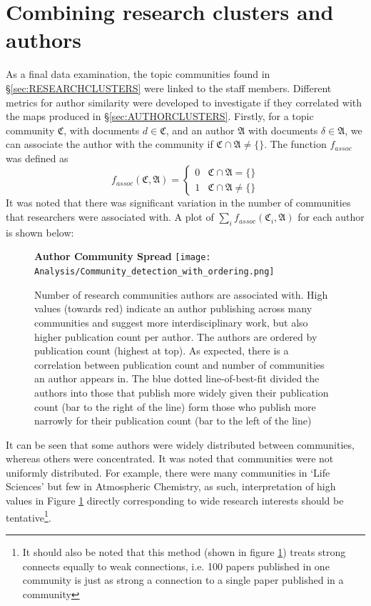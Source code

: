 \section{Combining research clusters and authors}
As a final data examination, the topic communities found in  \S\ref{sec:RESEARCHCLUSTERS} were linked to the staff members. Different metrics for author similarity were developed to investigate if they correlated with the maps produced in \S\ref{sec:AUTHORCLUSTERS}.
Firstly, for a topic community $\mathfrak{C}$, with documents $d \in \mathfrak{C}$, and an author $\mathfrak{A}$ with documents $\delta \in \mathfrak{A}$, we can associate the author with the community if $\mathfrak{C} \cap \mathfrak{A} \neq \{ \}$. The function $f_{assoc}$ was defined as 
\[ 
f_{assoc}\left( \mathfrak{C} , \mathfrak{A} \right) = \begin{cases} 
      0 & \mathfrak{C} \cap \mathfrak{A} = \{ \} \\
      1 & \mathfrak{C} \cap \mathfrak{A} \neq \{ \} 
   \end{cases}
\]
It was noted that there was significant variation in the number of communities that researchers were associated with. A plot of $\sum_i f_{assoc} \left( \mathfrak{C}_i , \mathfrak{A} \right)$ for each author is shown below:
\begin{center}
\begin{figure}[H]
  \centering
  \textbf{Author Community Spread}
    \texttt{[image: Analysis/Community\_detection\_with\_ordering.png]}
    \caption[Author community Spread]{Number of research communities authors are associated with. High values (towards red) indicate an author publishing across many communities and suggest more interdisciplinary work, but also higher publication count per author. The authors are ordered by publication count (highest at top). As expected, there is a correlation between publication count and number of communities an author appears in. The blue dotted line-of-best-fit divided the authors into those that publish more widely given their publication count (bar to the right of the line) form those who publish more narrowly for their publication count (bar to the left of the line)}
\label{fig:commbar}

\end{figure} 
\end{center}
It can be seen that some authors were widely distributed between communities, whereas others were concentrated.
It was noted that communities were not uniformly distributed. For example, there were many communities in `Life Sciences' but few in Atmospheric Chemistry, as such, interpretation of high values in Figure \ref{fig:commbar} directly corresponding to wide research interests should be tentative\footnote{It should also be noted that this method (shown in figure \ref{fig:commbar}) treats strong connects equally to weak connections, i.e. 100 papers published in one community is just as strong a connection to a single paper published in a community}.

